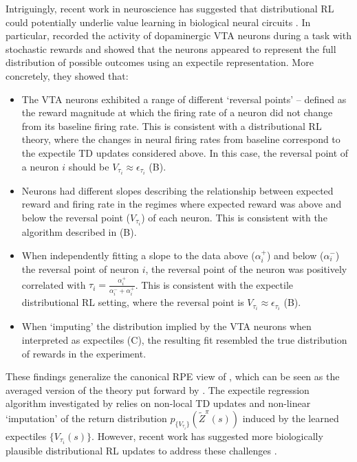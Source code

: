 Intriguingly, recent work in neuroscience has suggested that distributional RL could potentially underlie value learning in biological neural circuits \citep{dabney2020distributional,lowet2020distributional,sousa2023dopamine}.
In particular, \citet{dabney2020distributional} recorded the activity of dopaminergic VTA neurons during a task with stochastic rewards and showed that the neurons appeared to represent the full distribution of possible outcomes using an expectile representation.
More concretely, they showed that:
\begin{itemize}
    \item The VTA neurons exhibited a range of different `reversal points' -- defined as the reward magnitude at which the firing rate of a neuron did not change from its baseline firing rate.
    This is consistent with a distributional RL theory, where the changes in neural firing rates from baseline correspond to the expectile TD updates considered above.
    In this case, the reversal point of a neuron $i$ should be $V_{\tau_i} \approx \epsilon_{\tau_i}$ (B).
    \item Neurons had different slopes describing the relationship between expected reward and firing rate in the regimes where expected reward was above and below the reversal point ($V_{\tau_i}$) of each neuron.
    This is consistent with the algorithm described in  (B).
    \item When independently fitting a slope to the data above ($\alpha_i^+$) and below ($\alpha_i^-$) the reversal point of neuron $i$, the reversal point of the neuron was positively correlated with $\tau_i = \frac{\alpha_i^{+}}{\alpha_i^- + \alpha_i^+}$.
    This is consistent with the expectile distributional RL setting, where the reversal point is $V_{\tau_i} \approx \epsilon_{\tau_i}$ (B).
    \item When `imputing' the distribution implied by the VTA neurons when interpreted as expectiles (C), the resulting fit resembled the true distribution of rewards in the experiment.
\end{itemize}
These findings generalize the canonical RPE view of \citet{schultz1997neural}, which can be seen as the averaged version of the theory put forward by \citet{dabney2020distributional}.
The expectile regression algorithm investigated by \citet{dabney2020distributional} relies on non-local TD updates and non-linear `imputation' of the return distribution $p_{\{ V_{\tau_i} \} }(\tilde{Z}^\pi(s))$ induced by the learned expectiles $\{ V_{\tau_i}(s) \}$. 
However, recent work has suggested more biologically plausible distributional RL updates to address these challenges \citep{tano2020local,wenliang2023distributional}.
